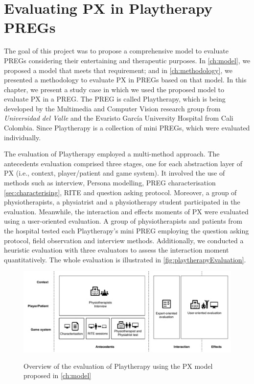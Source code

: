 \chapter{Evaluating PX in Playtherapy \acp{PREG}}
\label{ch:playtherapy}
The goal of this project was to propose a comprehensive model to evaluate \acp{PREG} considering their entertaining and therapeutic purposes. In \autoref{ch:model}, we proposed a model that meets that requirement; and in \autoref{ch:methodology}, we presented a methodology to evaluate \ac{PX} in \acp{PREG} based on that model. In this chapter, we present a study case in which we used the proposed model to evaluate \ac{PX} in a \ac{PREG}. The \ac{PREG} is called Playtherapy, which is being developed by the Multimedia and Computer Vision research group from \textit{Universidad del Valle} and the Evaristo Garc\'ia University Hospital from Cali Colombia. Since Playtherapy is a collection of mini \acp{PREG}, which were evaluated individually.

The evaluation of Playtherapy employed a multi-method approach. The antecedents evaluation comprised three stages, one for each abstraction layer of \ac{PX} (i.e., context, player/patient and game system). It involved the use of methods such as interview, Persona modelling, \ac{PREG} characterisation \autoref{sec:characterising}, \ac{RITE} and question asking protocol. Moreover, a group of physiotherapists, a physiatrist and a physiotherapy student participated in the evaluation. Meanwhile, the interaction and effects moments of \ac{PX} were evaluated using a user-oriented evaluation. A group of physiotherapists and patients from the hospital tested each Playtherapy's mini \ac{PREG} employing the question asking protocol, field observation and interview methods. Additionally, we conducted a heuristic evaluation with three evaluators to assess the interaction moment quantitatively. The whole evaluation is illustrated in \autoref{fig:playtherapyEvaluation}.

\begin{figure}[bth]
\myfloatalign
{\includegraphics[width=\linewidth]{gfx/playtherapy/playtherapyEvaluation}} \quad
\caption{Overview of the evaluation of Playtherapy using the \ac{PX} model proposed in \autoref{ch:model}}
\label{fig:playtherapyEvaluation}
\end{figure}


